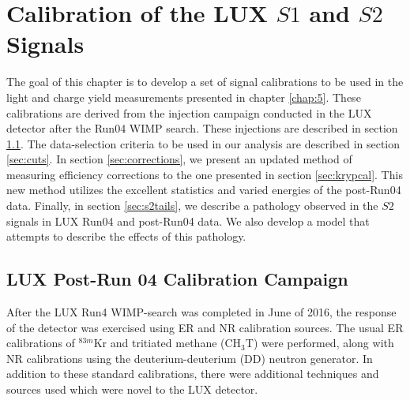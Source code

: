 \chapter{Calibration of the LUX $S1$ and $S2$ Signals}\label{chap:4}
The goal of this chapter is to develop a set of signal calibrations to be used in the light and charge yield measurements presented in chapter \ref{chap:5}. These calibrations are derived from the injection campaign conducted in the LUX detector after the Run04 WIMP search. These injections are described in section \ref{sec:postrun4}. The data-selection criteria to be used in our analysis are described in section \ref{sec:cuts}. In section \ref{sec:corrections}, we present an updated method of measuring efficiency corrections to the one presented in section \ref{sec:krypcal}. This new method utilizes the excellent statistics and varied energies of the post-Run04 data. Finally, in section \ref{sec:s2tails}, we describe a pathology observed in the $S2$ signals in LUX Run04 and post-Run04 data. We also develop a model that attempts to describe the effects of this pathology.

\section{LUX Post-Run 04 Calibration Campaign}\label{sec:postrun4}
After the LUX Run4 WIMP-search was completed in June of 2016, the response of the detector was exercised using ER and NR calibration sources. The usual ER calibrations of $^{83m}$Kr\cite{lux_kr1,lux_kr2} and tritiated methane (CH$_3$T)\cite{lux_tritium} were performed, along with NR calibrations using the deuterium-deuterium (DD) neutron generator\cite{lux_dd1,lux_dd2}. In addition to these standard calibrations, there were additional techniques and sources used which were novel to the LUX detector. 


